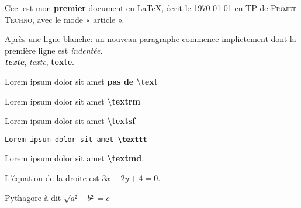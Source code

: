 \documentclass[a4paper]{article}
\begin{document}
Ceci est mon \textbf{premier} document en \LaTeX, écrit le \today{} en TP de \textsc{Projet Techno}, avec le mode « article ».

Après une ligne blanche: un nouveau paragraphe commence implictement dont la première ligne est \emph{indentée}.\\

\textbf{\emph{texte}}, \textsf{\emph{texte}}, \textsf{\textbf{texte}}.

Lorem ipsum dolor sit amet \textbf{pas de \textbackslash text}

\textrm{Lorem ipsum dolor sit amet \textbf{\textbackslash textrm}}

\textsf{Lorem ipsum dolor sit amet \textbf{\textbackslash textsf}}

\texttt{Lorem ipsum dolor sit amet \textbf{\textbackslash texttt}}

\textmd{Lorem ipsum dolor sit amet \textbf{\textbackslash textmd}}.

L’équation de la droite est $3x - 2y + 4 = 0$.

Pythagore à dit $\sqrt{a²+b²} = c$
\end{document}
